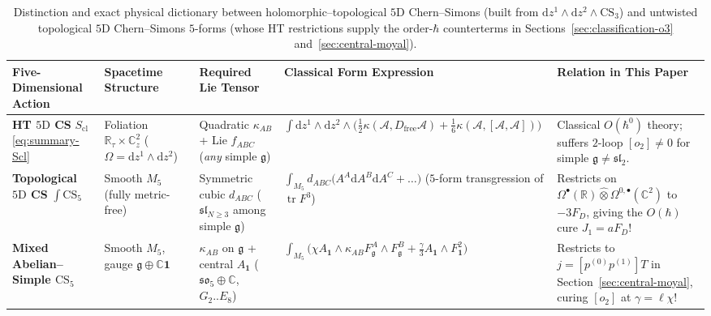 \documentclass[11pt,letterpaper]{article}
\numberwithin{equation}{section}
\theoremstyle{plain}
\theoremstyle{definition}
\theoremstyle{remark}
\newcommand{\dd}{\mathrm{d}}
\newcommand{\fg}{\mathfrak{g}}
\newcommand{\fsl}{\mathfrak{sl}}
\newcommand{\fso}{\mathfrak{so}}
\newcommand{\tr}{\operatorname{tr}}
\begin{document}
\begin{table}[H]
\centering
\scriptsize
\setlength{\tabcolsep}{3.6pt}
\renewcommand{\arraystretch}{1.22}
\begin{tabularx}{\textwidth}{@{}>{\raggedright\arraybackslash}p{2.5cm}>{\raggedright\arraybackslash}p{2.4cm}>{\raggedright\arraybackslash}p{2.4cm}>{\raggedright\arraybackslash}X>{\raggedright\arraybackslash}X@{}}
\toprule
\textbf{Five-Dimensional Action} & \textbf{Spacetime Structure} & \textbf{Required Lie Tensor} & \textbf{Classical Form Expression} & \textbf{Relation in This Paper} \\
\midrule
\textbf{HT $5\mathrm{D}$ CS} $S_{\mathrm{cl}}$ \eqref{eq:summary-Scl} & Foliation $\mathbb{R}_\tau\times\mathbb{C}^2_z$ ($\Omega = \dd z^1\wedge\dd z^2$) & Quadratic $\kappa_{AB}$ + Lie $f_{ABC}$ (\emph{any} simple $\fg$) & $\int\dd z^1{\wedge}\dd z^2{\wedge}\big(\frac{1}{2}\kappa(\mathcal{A},D_{\mathrm{free}}\mathcal{A}) + \frac{1}{6}\kappa(\mathcal{A},[\mathcal{A},\mathcal{A}])\big)$ & Classical $O(\hbar^0)$ theory; suffers $2$-loop $[o_2]\neq 0$ for simple $\fg\neq\fsl_2$. \\
\textbf{Topological $5\mathrm{D}$ CS} $\int\mathrm{CS}_5$ & Smooth $M_5$ (fully metric-free) & Symmetric cubic $d_{ABC}$ ($\fsl_{N\ge 3}$ among simple $\fg$) & $\int_{M_5} d_{ABC}\big(A^A\dd A^B\dd A^C + \dots\big)$ ($5$-form transgression of $\tr F^3$) & Restricts on $\Omega^\bullet(\mathbb{R})\widehat{\otimes}\Omega^{0,\bullet}(\mathbb{C}^2)$ to $-3F_D$, giving the $O(\hbar)$ cure $J_1 = a F_D$! \\
\textbf{Mixed Abelian--Simple $\mathrm{CS}_5$} & Smooth $M_5$, gauge $\fg\oplus\mathbb{C}\mathbf{1}$ & $\kappa_{AB}$ on $\fg$ + central $A_{\mathbf{1}}$ ($\fso_5\oplus\mathbb{C}$, $G_2..E_8$) & $\int_{M_5}\big(\chi A_{\mathbf{1}}\wedge\kappa_{AB}F^A_{\fg}{\wedge}F^B_{\fg} + \frac{\gamma}{3}A_{\mathbf{1}}{\wedge}F_{\mathbf{1}}^2\big)$ & Restricts to $j = [p^{(0)}p^{(1)}]T$ in Section~\ref{sec:central-moyal}, curing $[o_2]$ at $\gamma = \ell\chi$! \\
\bottomrule
\end{tabularx}
\caption{Distinction and exact physical dictionary between holomorphic--topological $5\mathrm{D}$ Chern--Simons (built from $\dd z^1\wedge\dd z^2\wedge\mathrm{CS}_3$) and untwisted topological $5\mathrm{D}$ Chern--Simons $5$-forms (whose HT restrictions supply the order-$\hbar$ counterterms in Sections~\ref{sec:classification-o3} and~\ref{sec:central-moyal}).}
\label{tab:cs-ladder}
\end{table}
\end{document}
